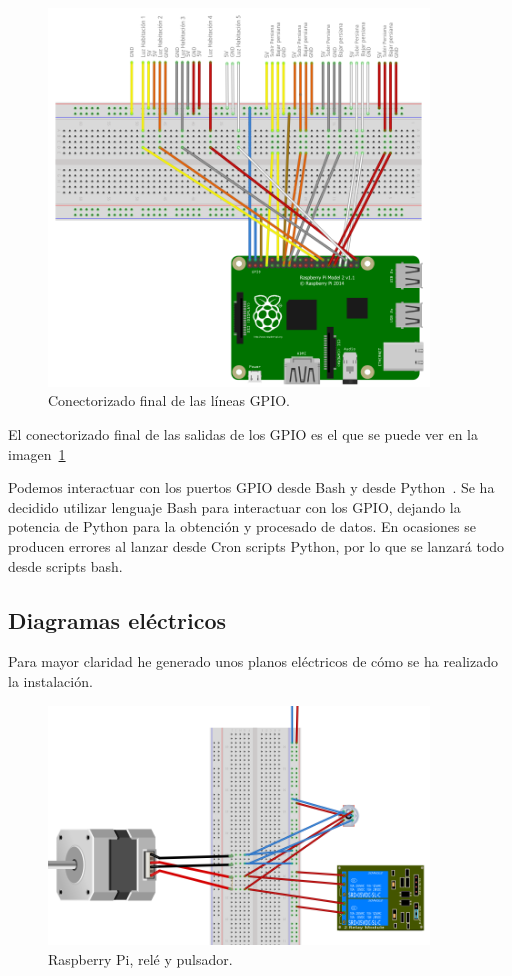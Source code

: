 \begin{figure}[h]
    \centering
    \includegraphics[width=0.9\textwidth]{img/RbP_CompletaLineas.png}
    \caption{Conectorizado final de las líneas GPIO.} \label{Img:RbP_CompletaLineas}
\end{figure}

El conectorizado final de las salidas de los GPIO es el que se puede ver en la imagen~\ref{Img:RbP_CompletaLineas}

Podemos interactuar con los puertos GPIO desde Bash y desde Python~\cite{misc:Python}. Se ha decidido utilizar lenguaje Bash para interactuar con los GPIO, dejando la potencia de Python para la obtención y procesado de datos. En ocasiones se producen errores al lanzar desde Cron scripts Python, por lo que se lanzará todo desde scripts bash.


\subsection{Diagramas eléctricos}
Para mayor claridad he generado unos planos eléctricos de cómo se ha realizado la instalación.

\begin{figure}[h]
    \centering
    \includegraphics[width=0.9\textwidth]{img/Diagramas/rele-pulsador-motor.png}
    \caption{Raspberry Pi, relé y pulsador.} \label{Img:Relé+Pulsador+Rbp_Fritzing}
\end{figure}


